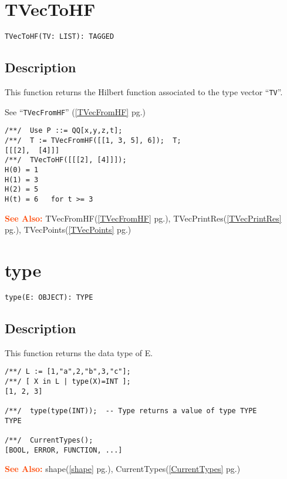 \documentclass[a4paper]{mybook}
\newenvironment{command}{}{} %
\newcommand\SeeAlso{\par\textcolor{OrangeRed}{\textbf{\large See Also: }}}
\begin{document}
\section{TVecToHF}
\label{TVecToHF}
\begin{command} %


\begin{Verbatim}[label=syntax, rulecolor=\color{MidnightBlue},
frame=single]
TVecToHF(TV: LIST): TAGGED
\end{Verbatim}


\subsection*{Description}

This function returns the Hilbert function associated to the type vector ``\verb&TV&''.
\par 
See ``\verb&TVecFromHF&'' (\ref{TVecFromHF} pg.\pageref{TVecFromHF})
\begin{Verbatim}[label=example, rulecolor=\color{PineGreen}, frame=single]
/**/  Use P ::= QQ[x,y,z,t];
/**/  T := TVecFromHF([[1, 3, 5], 6]);  T;
[[[2],  [4]]]
/**/  TVecToHF([[[2], [4]]]);
H(0) = 1
H(1) = 3
H(2) = 5
H(t) = 6   for t >= 3
\end{Verbatim}


\SeeAlso %
  TVecFromHF(\ref{TVecFromHF} pg.\pageref{TVecFromHF}), 
    TVecPrintRes(\ref{TVecPrintRes} pg.\pageref{TVecPrintRes}), 
    TVecPoints(\ref{TVecPoints} pg.\pageref{TVecPoints})
\end{command} %

\section{type}
\label{type}
\begin{command} %


\begin{Verbatim}[label=syntax, rulecolor=\color{MidnightBlue},
frame=single]
type(E: OBJECT): TYPE
\end{Verbatim}


\subsection*{Description}

This function returns the data type of E.
\begin{Verbatim}[label=example, rulecolor=\color{PineGreen}, frame=single]
/**/ L := [1,"a",2,"b",3,"c"];
/**/ [ X in L | type(X)=INT ];
[1, 2, 3]

/**/  type(type(INT));  -- Type returns a value of type TYPE
TYPE

/**/  CurrentTypes();
[BOOL, ERROR, FUNCTION, ...]
\end{Verbatim}


\SeeAlso %
  shape(\ref{shape} pg.\pageref{shape}), 
    CurrentTypes(\ref{CurrentTypes} pg.\pageref{CurrentTypes})
\end{command} %
\end{document}
